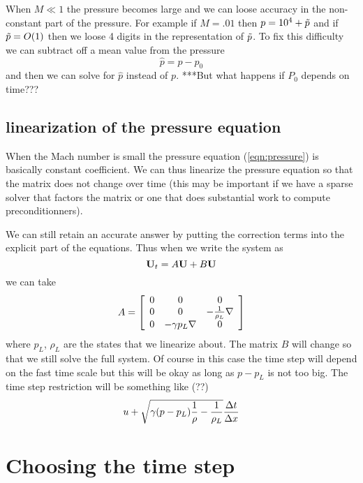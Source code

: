 \documentclass[10pt]{article}
\begin{document}
When $M\ll 1$ the pressure becomes large and we can loose accuracy in the non-constant part of
the pressure. For example if $M=.01$ then $p=10^4+\tilde{p}$ and if $\tilde{p}=O(1)$ then we loose 4 digits
in the representation of $\tilde{p}$.
To fix this difficulty we can subtract off a mean value from the pressure
\[
    \hat{p} = p - p_0
\]
and then we can solve for $\hat{p}$ instead of $p$. ***But what happens if $P_0$ depends on time???


\subsection{linearization of the pressure equation}

When the Mach number is small the pressure equation (\ref{eqn:pressure}) is basically constant coefficient.
We can thus linearize the pressure equation so that the matrix does not change over time (this may
be important if we have a sparse solver that factors the matrix or one that does substantial work
to compute preconditionners). 

We can still retain an accurate answer by putting the correction terms into the explicit
part of the equations. Thus when we write the system as
\[
   {\bf U}_t = A {\bf U} + B {\bf U} 
\]
we can take 
\[
  A = \left[ \begin{array}{ccc}
                0 & 0 & 0 \\
                0 & 0 & -{1\over\rho_L}  \nabla  \\
                0 &  -\gamma p_L  \nabla  & 0 
             \end{array} \right]
\]
where $p_L$, $\rho_L$ are the states that we linearize about. The matrix $B$ will change so that
we still solve the full system. Of course in this case the time step will depend on the fast time scale
but this will be okay as long as $p-p_L$ is not too big. The time step restriction will be something like (??)
$$
      u + \sqrt{ \gamma {(p-p_L){{1\over\rho}- {1\over\rho_L}} } } {\Delta t \over \Delta x}
$$

\section{Choosing the time step}
\end{document}

